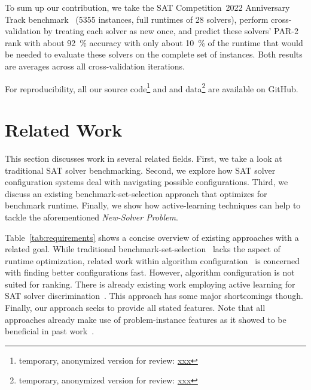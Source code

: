 \documentclass[runningheads]{llncs}
\begin{document}
To sum up our contribution, we take the SAT Competition~2022 Anniversary Track benchmark~\cite{sat2022} (5355 instances, full runtimes of 28 solvers), perform cross-validation by treating each solver as new once, and predict these solvers' PAR-2 rank with about \SI{92}{\%} accuracy with only about \SI{10}{\%} of the runtime that would be needed to evaluate these solvers on the complete set of instances.
Both results are averages across all cross-validation iterations.

For reproducibility, all our source code\footnote{temporary, anonymized version for review: \url{xxx}} and and data\footnote{temporary, anonymized version for review: \url{xxx}} are available on GitHub.


\section{Related Work}
This section discusses work in several related fields.
First, we take a look at traditional SAT solver benchmarking.
Second, we explore how SAT solver configuration systems deal with navigating possible configurations.
Third, we discuss an existing benchmark-set-selection approach that optimizes for benchmark runtime.
Finally, we show how active-learning techniques can help to tackle the aforementioned \emph{New-Solver Problem}.

Table~\ref{tab:requirements} shows a concise overview of existing approaches with a related goal.
While traditional benchmark-set-selection~\cite{HoosKSS13} lacks the aspect of runtime optimization, related work within algorithm configuration~\cite{HutterHL11} is concerned with finding better configurations fast.
However, algorithm configuration is not suited for ranking.
There is already existing work employing active learning for SAT solver discrimination~\cite{MatriconAFSH21}.
This approach has some major shortcomings though.
Finally, our approach seeks to provide all stated features.
Note that all approaches already make use of problem-instance features as it showed to be beneficial in past work~\cite{HoosKSS13,CollauttiMMO13,NgokoCT19}.
\end{document}
